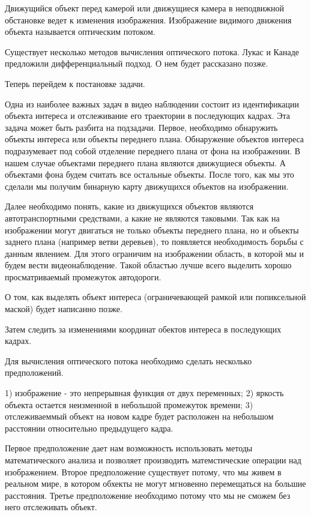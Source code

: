 \documentclass[12pt,a4paper,oneside,titlepage]{article}
\begin{document}
Движущийся объект перед камерой или движущиеся камера в неподвижной обстановке ведет к изменения изображения.
Изображение видимого движения объекта называется оптическим потоком.

Существует несколько методов вычисления оптического потока.
Лукас и Канаде предложили дифференциальный подход.
О нем будет рассказано позже.

Теперь перейдем к постановке задачи.

Одна из наиболее важных задач в видео наблюдении состоит из идентификации объекта интереса и отслеживание его траектории в последующих кадрах.
Эта задача может быть разбита на подзадачи.
Первое, необходимо обнаружить объекты интереса или объекты переднего плана.
Обнаружение объектов интереса подразумевает под собой отделение переднего плана от фона на изображении.
В нашем случае объектами переднего плана являются движущиеся объекты.
А объектами фона будем считать все остальные объекты.
После того, как мы это сделали мы получим бинарную карту движущихся объектов на изображении.

Далее необходимо понять, какие из движущихся объектов являются автотранспортными средствами, а какие не являются таковыми. 
Так как на изображении могут двигаться не только объекты переднего плана, но и объекты заднего плана (например ветви деревьев), то появляется необходимость борьбы с данным явлением.
Для этого ограничим на изображении область, в которой мы и будем вести видеонаблюдение. %
Такой областью лучше всего выделить хорошо просматриваемый промежуток автодороги.



О том, как выделять объект интереса (ограничевающей рамкой или попиксельной маской) будет написанно позже.

Затем следить за изменениями координат обектов интереса в последующих кадрах.





Для вычисления оптического потока необходимо сделать несколько предположений.

1) изображение - это непрерывная функция от двух переменных;
2) яркость объекта остается неизменной в небольшой промежуток времени;
3) отслеживаеммый объект на новом кадре будет расположен на небольшом расстоянии относительно предыдущего кадра.

Первое предположение дает нам возможность использовать методы математического анализа и позволяет производить матемстические операции над изображением.
Второе предположение существует потому, что мы живем в реальном мире, в котором  обхекты не могут мгновенно перемещаться на большие расстояния.
Третье предположение необходимо потому что мы не сможем без него отслеживать объект.
\end{document}
